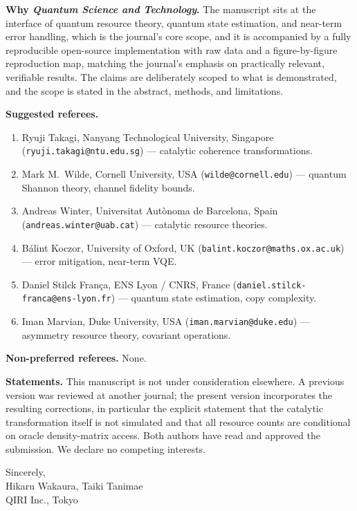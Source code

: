\documentclass[11pt,a4paper]{article}
\begin{document}
\textbf{Why \emph{Quantum Science and Technology}.}
The manuscript sits at the interface of quantum resource theory, quantum state estimation, and near-term error handling, which is the journal's core scope, and it is accompanied by a fully reproducible open-source implementation with raw data and a figure-by-figure reproduction map, matching the journal's emphasis on practically relevant, verifiable results.
The claims are deliberately scoped to what is demonstrated, and the scope is stated in the abstract, methods, and limitations.

\textbf{Suggested referees.}
\begin{enumerate}\setlength{\itemsep}{0pt}
\item Ryuji Takagi, Nanyang Technological University, Singapore (\texttt{ryuji.takagi@ntu.edu.sg}) --- catalytic coherence transformations.
\item Mark M.\ Wilde, Cornell University, USA (\texttt{wilde@cornell.edu}) --- quantum Shannon theory, channel fidelity bounds.
\item Andreas Winter, Universitat Aut\`onoma de Barcelona, Spain (\texttt{andreas.winter@uab.cat}) --- catalytic resource theories.
\item B\'alint Koczor, University of Oxford, UK (\texttt{balint.koczor@maths.ox.ac.uk}) --- error mitigation, near-term VQE.
\item Daniel Stilck Fran\c{c}a, ENS Lyon / CNRS, France (\texttt{daniel.stilck-franca@ens-lyon.fr}) --- quantum state estimation, copy complexity.
\item Iman Marvian, Duke University, USA (\texttt{iman.marvian@duke.edu}) --- asymmetry resource theory, covariant operations.
\end{enumerate}
\textbf{Non-preferred referees.} None.

\textbf{Statements.}
This manuscript is not under consideration elsewhere. A previous version was reviewed at another journal; the present version incorporates the resulting corrections, in particular the explicit statement that the catalytic transformation itself is not simulated and that all resource counts are conditional on oracle density-matrix access.
Both authors have read and approved the submission. We declare no competing interests.

\vspace{0.4cm}
Sincerely,\\[0.4em]
Hikaru Wakaura, Taiki Tanimae\\
QIRI Inc., Tokyo
\end{document}
